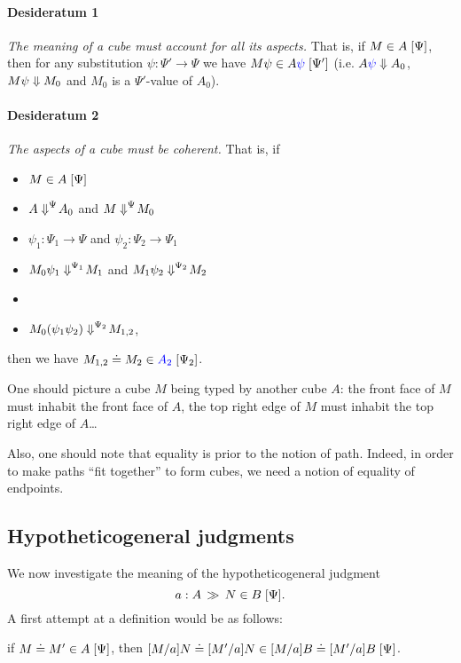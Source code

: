 \documentclass{article}
\begin{document}
\begin{mdframed}
\paragraph{Desideratum 1} 
\emph{The meaning of a cube must account for all its aspects.}
That is, if $\InTypeDim{M}{A}{\Psi}$, then for any substitution
$\psi : \Psi' \to \Psi$ we have $\InTypeDim{M \psi}{A\colored{\psi}}{\Psi'}$
(i.e. $\eval{A\colored{\psi}}{A_0}$, $\eval{M \psi}{M_0}$ and $M_0$ is a
$\Psi'$-value of $A_0$).

\paragraph{Desideratum 2}
\emph{The aspects of a cube must be coherent.} That is, 
if
\begin{itemize}
\item $\InTypeDim{M}{A}{\Psi}$
\item $\evalDim{A}{A_0}{\Psi}$ and $\evalDim{M}{M_0}{\Psi}$
\item $\psi_1 : \Psi_1 \to \Psi$ and $\psi_2 : \Psi_2 \to \Psi_1$
\item $\evalDim{M_0 \psi_1}{M_1}{\Psi_1}$ and $\evalDim{M_1 \psi_2}{M_2}{\Psi_2}$
\item {}
\item $\evalDim{M_0(\psi_1\psi_2)}{M_{1,2}}{\Psi_2}$,
\end{itemize}
then we have $\EqInTypeDim{M_{1,2}}{M_2}{\colored{A_2}}{\Psi_2}$.

\bigskip

\end{mdframed}

\medskip

One should picture a cube $M$ being typed
by another cube $A$: the front face of $M$ must inhabit the front face of $A$,
the top right edge of $M$ must inhabit the top right edge of $A$\dots

Also, one should note that equality is prior to the notion of path. Indeed,
in order to  make paths ``fit together'' to form cubes, we need a notion of
equality of endpoints.


\subsection{Hypotheticogeneral judgments}

We now investigate the meaning of the hypotheticogeneral judgment
\[ a : A \, \gg \, \InTypeDim{N}{B}{\Psi}  .\]
A first attempt at a definition would be as follows:
\begin{center}
  if $\EqInTypeDim{M}{M'}{A}{\Psi}$, \quad  then \quad
  $\EqInTypeDim{\subst{M}{a}{N}}{\subst{M'}{a}{N}}{\subst{M}{a}{B} \doteq \subst{M'}{a}{B}}{\Psi}$.
\end{center}
\end{document}
